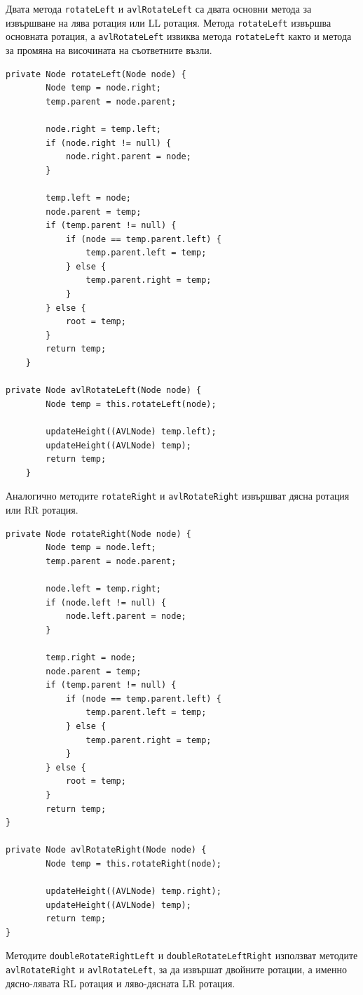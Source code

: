 \documentclass[a4paper,fleqn,12pt]{article}
\begin{document}
\newpage
\noindent 
Двата метода \texttt{rotateLeft} и \texttt{avlRotateLeft} са двата основни метода за извършване на лява ротация или LL ротация. Метода \texttt{rotateLeft} извършва основната ротация, а \texttt{avlRotateLeft} извиква метода \texttt{rotateLeft} както и метода за промяна на височината на съответните възли. 
\begin{lstlisting}
private Node rotateLeft(Node node) {
        Node temp = node.right;
        temp.parent = node.parent;

        node.right = temp.left;
        if (node.right != null) {
            node.right.parent = node;
        }

        temp.left = node;
        node.parent = temp;
        if (temp.parent != null) {
            if (node == temp.parent.left) {
                temp.parent.left = temp;
            } else {
                temp.parent.right = temp;
            }
        } else {
            root = temp;
        }
        return temp;
    }

private Node avlRotateLeft(Node node) {
        Node temp = this.rotateLeft(node);

        updateHeight((AVLNode) temp.left);
        updateHeight((AVLNode) temp);
        return temp;
    }
\end{lstlisting}
\newpage
\noindent 
Аналогично методите \texttt{rotateRight} и \texttt{avlRotateRight} извършват дясна ротация или RR ротация. 
\begin{lstlisting}
private Node rotateRight(Node node) {
        Node temp = node.left;
        temp.parent = node.parent;

        node.left = temp.right;
        if (node.left != null) {
            node.left.parent = node;
        }

        temp.right = node;
        node.parent = temp;
        if (temp.parent != null) {
            if (node == temp.parent.left) {
                temp.parent.left = temp;
            } else {
                temp.parent.right = temp;
            }
        } else {
            root = temp;
        }
        return temp;
}

private Node avlRotateRight(Node node) {
        Node temp = this.rotateRight(node);

        updateHeight((AVLNode) temp.right);
        updateHeight((AVLNode) temp);
        return temp;
}
\end{lstlisting}
\noindent
Методите \texttt{doubleRotateRightLeft} и \texttt{doubleRotateLeftRight} използват методите \texttt{avlRotateRight} и \texttt{avlRotateLeft}, за да извършат двойните ротации, а именно дясно-лявата RL ротация и ляво-дясната LR ротация.
\end{document}
